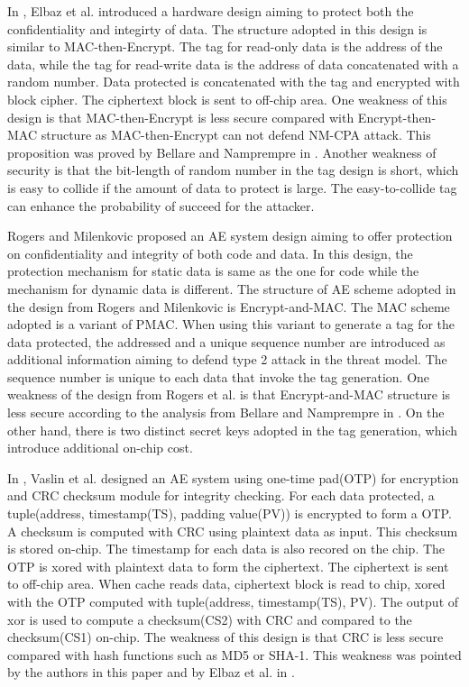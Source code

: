 \documentclass{article}
\begin{document}
In \cite{keylist}, Elbaz et al. introduced a hardware design aiming to protect both the confidentiality and integirty of data. The structure adopted in this design is similar to MAC-then-Encrypt. The tag for read-only data is the address of the data, while the tag for read-write data is the address of data concatenated with a random number. Data protected is concatenated with the tag and encrypted with block cipher. The ciphertext block is sent to off-chip area.
One weakness of this design is that MAC-then-Encrypt is less secure compared with Encrypt-then-MAC structure as MAC-then-Encrypt can not defend NM-CPA attack. This proposition was proved by Bellare and Namprempre in \cite{keylist}.
Another weakness of security is that the bit-length of random number in the tag design is short, which is easy to collide if the amount of data to protect is large. The easy-to-collide tag can enhance the probability of succeed for the attacker.


Rogers and Milenkovic proposed an AE system design aiming to offer protection on confidentiality and integrity of both code and data. In this design, the protection mechanism for static data is same as the one for code while the mechanism for dynamic data is different.
The structure of AE scheme adopted in the design from Rogers and Milenkovic is Encrypt-and-MAC. The MAC scheme adopted is a variant of PMAC. When using this variant to generate a tag for the data protected, the addressed and a unique sequence number are introduced as additional information aiming to defend type 2 attack in the threat model. The sequence number is unique to each data that invoke the tag generation.
One weakness of the design from Rogers et al. is that Encrypt-and-MAC structure is less secure according to the analysis from Bellare and Namprempre in \cite{keylist}. On the other hand, there is two distinct secret keys adopted in the tag generation, which introduce additional on-chip cost.

In \cite{keylist}, Vaslin et al. designed an AE system using one-time pad(OTP) for encryption and CRC checksum module for integrity checking. For each data protected, a tuple(address, timestamp(TS), padding value(PV)) is encrypted to form a OTP. A checksum is computed with CRC using plaintext data as input. This checksum is stored on-chip. The timestamp for each data is also recored on the chip. The OTP is xored with plaintext data to form the ciphertext. The ciphertext is sent to off-chip area. 
When cache reads data, ciphertext block is read to chip, xored with the OTP computed with tuple(address, timestamp(TS), PV). The output of xor is used to compute a checksum(CS2) with CRC and compared to the checksum(CS1) on-chip. 
The weakness of this design is that CRC is less secure compared with hash functions such as MD5 or SHA-1. This weakness was pointed by the authors in this paper and by Elbaz et al. in \cite{keylist}.



\end{document}
